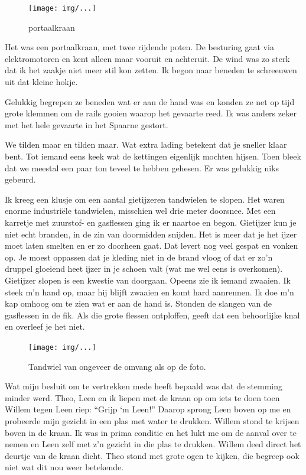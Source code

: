 \documentclass[12pt,twoside, openright]{memoir}
\begin{document}
\begin{figure}[t]
\texttt{[image: img/...]}
\caption{portaalkraan}
\end{figure}

Het was een portaalkraan, met twee rijdende poten. De besturing gaat via elektromotoren en kent alleen maar vooruit en achteruit. De wind was zo sterk dat ik het zaakje niet meer stil kon zetten. Ik begon naar beneden te schreeuwen uit dat kleine hokje. 

Gelukkig begrepen ze beneden wat er aan de hand was en konden ze net op tijd grote klemmen om de rails gooien waarop het gevaarte reed. Ik was anders zeker met het hele gevaarte in het Spaarne gestort.

We tilden maar en tilden maar. Wat extra lading betekent dat je sneller klaar bent. Tot iemand eens keek wat de kettingen eigenlijk mochten hijsen. Toen bleek dat we meestal een paar ton teveel te hebben gehesen. Er was gelukkig niks gebeurd.

Ik kreeg een klusje om een aantal gietijzeren tandwielen te slopen. Het waren enorme industriële tandwielen, misschien wel drie meter doorsnee. Met een karretje met zuurstof- en gasflessen ging ik er naartoe en begon. Gietijzer kun je niet echt branden, in de zin van doormidden snijden. Het is meer dat je het ijzer moet laten smelten en er zo doorheen gaat. Dat levert nog veel gespat en vonken op. Je moest oppassen dat je kleding niet in de brand vloog of dat er zo’n druppel gloeiend heet ijzer in je schoen valt (wat me wel eens is overkomen). Gietijzer slopen is een kwestie van doorgaan. Opeens zie ik iemand zwaaien. Ik steek m’n hand op, maar hij blijft zwaaien en komt hard aanrennen. Ik doe m’n kap omhoog om te zien wat er aan de hand is. Stonden de slangen van de gasflessen in de fik. Als die grote flessen ontploffen, geeft dat een behoorlijke knal en overleef je het niet. 

\begin{figure}[t]
\texttt{[image: img/...]}
\caption{Tandwiel van ongeveer de omvang als op de foto.}
\end{figure}

Wat mijn besluit om te vertrekken mede heeft bepaald was dat de stemming minder werd. Theo, Leen en ik liepen met de kraan op om iets te doen toen Willem tegen Leen riep: ``Grijp ‘m Leen!'' Daarop sprong Leen boven op me en probeerde mijn gezicht in een plas met water te drukken. Willem stond te krijsen boven in de kraan. Ik was in prima conditie en het lukt me om de aanval  over te nemen en Leen zelf met z’n gezicht in die plas te drukken. Willem deed direct het deurtje van de kraan dicht. Theo stond met grote ogen te kijken, die begreep ook niet wat dit nou weer betekende.
\end{document}
